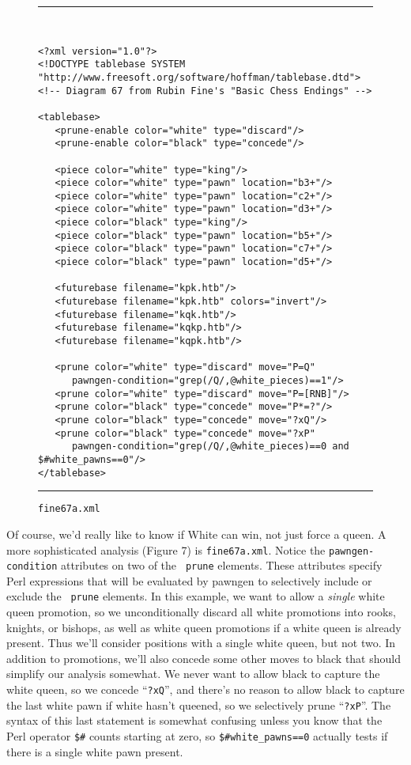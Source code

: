 \documentclass[11pt]{article}
\begin{document}
\begin{figure}
\hrule\ 
{\small\begin{verbatim}
<?xml version="1.0"?>
<!DOCTYPE tablebase SYSTEM "http://www.freesoft.org/software/hoffman/tablebase.dtd">
<!-- Diagram 67 from Rubin Fine's "Basic Chess Endings" -->

<tablebase>
   <prune-enable color="white" type="discard"/>
   <prune-enable color="black" type="concede"/>

   <piece color="white" type="king"/>
   <piece color="white" type="pawn" location="b3+"/>
   <piece color="white" type="pawn" location="c2+"/>
   <piece color="white" type="pawn" location="d3+"/>
   <piece color="black" type="king"/>
   <piece color="black" type="pawn" location="b5+"/>
   <piece color="black" type="pawn" location="c7+"/>
   <piece color="black" type="pawn" location="d5+"/>

   <futurebase filename="kpk.htb"/>
   <futurebase filename="kpk.htb" colors="invert"/>
   <futurebase filename="kqk.htb"/>
   <futurebase filename="kqkp.htb"/>
   <futurebase filename="kqpk.htb"/>

   <prune color="white" type="discard" move="P=Q"
      pawngen-condition="grep(/Q/,@white_pieces)==1"/>
   <prune color="white" type="discard" move="P=[RNB]"/>
   <prune color="black" type="concede" move="P*=?"/>
   <prune color="black" type="concede" move="?xQ"/>
   <prune color="black" type="concede" move="?xP"
      pawngen-condition="grep(/Q/,@white_pieces)==0 and $#white_pawns==0"/>
</tablebase>
\end{verbatim}}
\hrule
\caption{\tt fine67a.xml}
\end{figure}

Of course, we'd really like to know if White can win, not just force a
queen.  A more sophisticated analysis (Figure 7) is {\tt fine67a.xml}.
Notice the {\tt pawngen-condition} attributes on two of the {\tt
prune} elements.  These attributes specify Perl expressions that will
be evaluated by pawngen to selectively include or exclude the {\tt
prune} elements.  In this example, we want to allow a {\it single}
white queen promotion, so we unconditionally discard all white
promotions into rooks, knights, or bishops, as well as white queen
promotions if a white queen is already present.  Thus we'll consider
positions with a single white queen, but not two.  In addition to
promotions, we'll also concede some other moves to black that should
simplify our analysis somewhat.  We never want to allow black to
capture the white queen, so we concede ``{\tt ?xQ}'', and there's no
reason to allow black to capture the last white pawn if white hasn't
queened, so we selectively prune ``{\tt ?xP}''.  The syntax of this
last statement is somewhat confusing unless you know that the Perl
operator {\tt \$\#} counts starting at zero, so {\tt \$\#white\_pawns==0}
actually tests if there is a single white pawn present.
\end{document}
